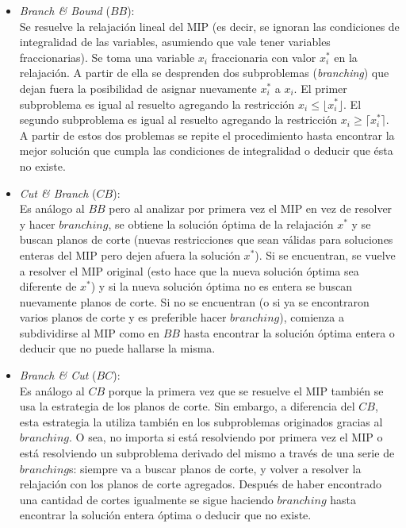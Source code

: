 \begin{itemize}
\item \emph{Branch \& Bound} ($BB$):\\
Se resuelve la relajación lineal del MIP (es decir, se ignoran las condiciones de integralidad de las variables, asumiendo que vale tener variables fraccionarias). Se toma una variable $x_i$ fraccionaria con valor $x^*_i$ en la relajación. A partir de ella se desprenden dos subproblemas (\emph{branching}) que dejan fuera la posibilidad de asignar nuevamente $x^*_i$ a $x_i$. El primer subproblema es igual al resuelto agregando la restricción $x_i \leq \lfloor x^*_i \rfloor$. El segundo subproblema es igual al resuelto agregando la restricción $x_i \geq \lceil x^*_i \rceil$. A partir de estos dos problemas se repite el procedimiento hasta encontrar la mejor solución que cumpla las condiciones de integralidad o deducir que ésta no existe.

\item \emph{Cut \& Branch} ($CB$):\\
Es análogo al $BB$ pero al analizar por primera vez el MIP en vez de resolver y hacer $branching$, se obtiene la solución óptima de la relajación $x^*$ y se buscan planos de corte (nuevas restricciones que sean válidas para soluciones enteras del MIP pero dejen afuera la solución $x^*$). Si se encuentran, se vuelve a resolver el MIP original (esto hace que la nueva solución óptima sea diferente de $x^*$) y si la nueva solución óptima no es entera se buscan nuevamente planos de corte. Si no se encuentran (o si ya se encontraron varios planos de corte y es preferible hacer $branching$), comienza a subdividirse al MIP como en $BB$ hasta encontrar la solución óptima entera o deducir que no puede hallarse la misma.

\item \emph{Branch \& Cut} ($BC$):\\
Es análogo al $CB$ porque la primera vez que se resuelve el MIP también se usa la estrategia de los planos de corte. Sin embargo, a diferencia del $CB$, esta estrategia la utiliza también en los subproblemas originados gracias al $branching$. O sea, no importa si está resolviendo por primera vez el MIP o está resolviendo un subproblema derivado del mismo a través de una serie de $branching$s: siempre va a buscar planos de corte, y volver a resolver la relajación con los planos de corte agregados. Después de haber encontrado una cantidad de cortes igualmente se sigue haciendo $branching$ hasta encontrar la solución entera óptima o deducir que no existe.
\end{itemize}

